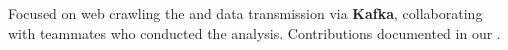 \item{Focused on web crawling the  and data transmission via \textbf{Kafka}, collaborating with teammates who conducted the analysis. Contributions documented in our .}

